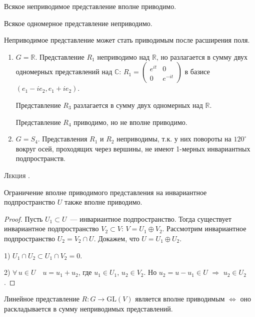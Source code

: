 \documentclass[a4paper]{article}
\newcounter{lec}
\renewcommand{\thelec}{\Roman{lec}}
\newcommand*{\lecture}[1]{\refstepcounter{lec}\vspace{20pt}
\begin{center}{\rmfamily\textsc{Лекция \thelec. \\ \textbf{#1}}}\vspace{5pt}
\end{center}}
\begin{document}
Всякое неприводимое представление вполне приводимо.

Всякое одномерное представление неприводимо.

Неприводимое представление может стать приводимым после расширения
поля.

\begin{ex}
\begin{enumerate}
  \item $G=\mathbb{R}$. Представление $R_1$ неприводимо над
  $\mathbb{R}$, но разлагается в сумму двух одномерных представлений
  над $\mathbb{C}$: $R_1=\left(\begin{smallmatrix} e^{it} & 0\\ 0 &
  e^{-it}\end{smallmatrix}\right)$ в базисе $(e_1-ie_2, e_1+ie_2)$.

  Представление $R_3$ разлагается в сумму двух одномерных над
  $\mathbb{R}$.

  Представление $R_4$ приводимо, но не вполне приводимо.
  \item $G=S_4$. Представления $R_1$ и $R_2$ неприводимы, т.к. у них
  повороты на $120^\circ$ вокруг осей, проходящих через вершины, не
  имеют 1-мерных инвариантных подпространств.
\end{enumerate}
\end{ex}
\lecture{}

\begin{theorem}
Ограничение вполне приводимого представления на инвариантное
подпространство $U$ также вполне приводимо.
\end{theorem}

\begin{proof}
Пусть $U_1\subset U$~--- инвариантное подпространство. Тогда
существует инвариантное подпространство $V_2\subset V$: $V=U_1\oplus
V_2$. Рассмотрим инвариантное подпространство $U_2=V_2\cap U$.
Докажем, что $U=U_1\oplus U_2$.

1) $U_1\cap U_2\subset U_1\cap V_2=0$.

2) $\forall \, u\in U\quad u=u_1+u_2$, где $u_1\in U_1$, $u_2\in
V_2$. Но $u_2=u-u_1\in U$ $\Rightarrow$ $u_2\in U_2$.
\end{proof}

\begin{theorem}
Линейное представление $R\colon G\to \mathrm{GL}(V)$ является вполне
приводимым $\Leftrightarrow$ оно раскладывается в сумму неприводимых
представлений.
\end{theorem}
\end{document}
